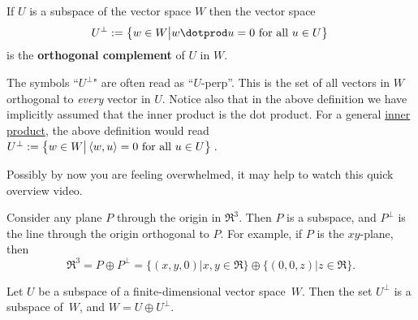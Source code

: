 \begin{definition}
If $U$ is a subspace of the vector space $W$ then the vector space 
\[U^\perp := \big\{w\in W \big| w\dotprod u=0 \text{ for all } u\in U\big\}\, \]
is the {\bfseries orthogonal complement} of $U$ in $W$. 
\end{definition}


\begin{remark}
The symbols ``$U^\perp$" are often read as ``$U$-perp''.  This is the set of all vectors in $W$ orthogonal to \emph{every} vector in $U$. 
Notice also that in the above definition we have implicitly assumed that the inner product is the dot product. For a general \hyperlink{inner_product}{inner product}, the  
above definition would read $U^\perp := \big\{w\in W \big|\,  \langle w,u\rangle=0 \ {\rm  for\  all } \ u\in U\big\}\, $.
\end{remark}
Possibly by now you are feeling overwhelmed, it may help to watch this quick overview video.




\begin{example}
Consider any plane $P$ through the origin in $\Re^3$.  Then $P$ is a subspace, and $P^\perp$ is the line through the origin orthogonal to $P$.  For example, if $P$ is the $xy$-plane, then
\[
\Re^3=P\oplus P^\perp=\{(x,y,0)| x,y\in \Re \} \oplus \{(0,0,z)| z\in \Re \}.
\]
\end{example}

\begin{theorem}
Let $U$ be a subspace of a finite-dimensional vector space~$W$.  Then the set $U^\perp$ is a subspace of~$W$, and $W=U\oplus U^\perp$.
\end{theorem}

